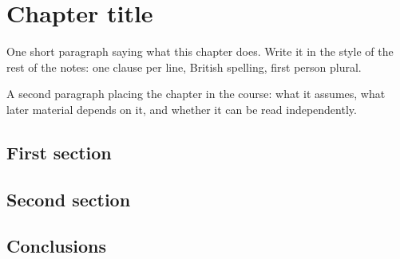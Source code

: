 
\chapter{Chapter title}
\label{chap.topic}

One short paragraph saying what this chapter does.
Write it in the style of the rest of the notes:
one clause per line,
British spelling,
first person plural.

A second paragraph placing the chapter in the course:
what it assumes,
what later material depends on it,
and whether it can be read independently.

\section{First section}
\label{sec.firstSection}


\section{Second section}
\label{sec.secondSection}


\section{Conclusions}
\label{sec.topicConclusions}

